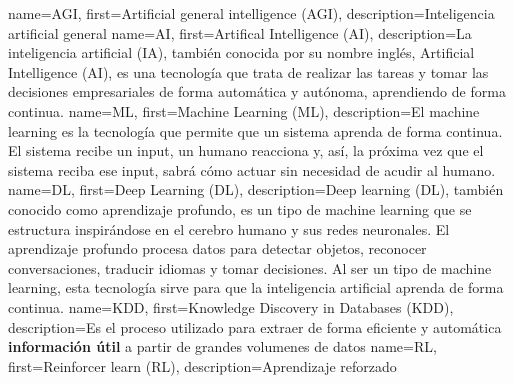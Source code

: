       {name={AGI},        first={Artificial general intelligence (AGI)},          description={Inteligencia artificial general}}
       {name={AI},         first={Artifical Intelligence (AI)},                    description={La inteligencia artificial (IA), también conocida por su nombre inglés, Artificial Intelligence (AI), es una tecnología que trata de realizar las tareas y tomar las decisiones empresariales de forma automática y autónoma, aprendiendo de forma continua. \cite{glosario-tic-artificial-intelligence}}}
       {name={ML},         first={Machine Learning (ML)},                          description={El machine learning es la tecnología que permite que un sistema aprenda de forma continua. El sistema recibe un input, un humano reacciona y, así, la próxima vez que el sistema reciba ese input, sabrá cómo actuar sin necesidad de acudir al humano. \cite{glosario-tic-machine-learning}}}
       {name={DL},         first={Deep Learning (DL)},                             description={Deep learning (DL), también conocido como aprendizaje profundo, es un tipo de machine learning que se estructura inspirándose en el cerebro humano y sus redes neuronales. El aprendizaje profundo procesa datos para detectar objetos, reconocer conversaciones, traducir idiomas y tomar decisiones. Al ser un tipo de machine learning, esta tecnología sirve para que la inteligencia artificial aprenda de forma continua. \cite{glosario-tic-deep-learning}}}
      {name={KDD},        first={Knowledge Discovery in Databases (KDD)},         description={Es el proceso utilizado para extraer de forma eficiente y automática \textbf{información útil} a partir de grandes volumenes de datos}}
       {name={RL},         first={Reinforcer learn (RL)},                          description={Aprendizaje reforzado}}

